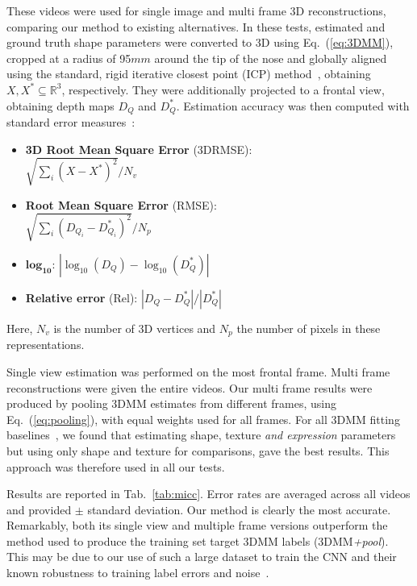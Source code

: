 \documentclass[10pt,twocolumn,letterpaper]{article}
\begin{document}
These videos were used for single image and multi frame 3D reconstructions, comparing our method to existing alternatives. In these tests, estimated and ground truth shape parameters were converted to 3D using Eq.~(\ref{eq:3DMM}), cropped at a radius of 95$mm$ around the tip of the nose and globally aligned using the standard, rigid iterative closest point (ICP) method~\cite{besl1992method}, obtaining $X, X^*\subseteq \mathbb{R}^3$, respectively. They were additionally projected to a frontal view, obtaining depth maps $D_Q$ and $D_Q^*$. Estimation accuracy was then computed with standard error measures~\cite{hassner2013viewing,saxena08dist}:
\begin{itemize}
\item {\bf 3D Root Mean Square Error} (3DRMSE):\\$\sqrt{ \sum_i (X - X^*)^2} /N_v$
\item {\bf Root Mean Square Error} (RMSE):\\$\sqrt{ \sum_i (D_{Q_i} - D_{Q_i}^*)^2} /N_p$
\item $\mathbf{log_{10}}$: $|\log_{10}(D_Q)-\log_{10}(D_Q^*)|$
\item {\bf Relative error} (Rel): $|D_Q-D_Q^*|/|D_Q^*|$
\end{itemize}
Here, $N_v$ is the number of 3D vertices and $N_p$ the number of pixels in these representations.

Single view estimation was performed on the most frontal frame. Multi frame reconstructions were given the entire videos. Our multi frame results were produced by pooling 3DMM estimates from different frames, using Eq.~(\ref{eq:pooling}), with equal weights used for all frames. For all 3DMM fitting baselines~\cite{Bas:accvw16,huber:3dmm,romdhani2005estimating,Zhu2016Face}, we found that estimating shape, texture {\em and expression} parameters but using only shape and texture for comparisons, gave the best results. This approach was therefore used in all our tests.






Results are reported in Tab.~\ref{tab:micc}. Error rates are averaged across all videos and provided $\pm$ standard deviation. Our method is clearly the most accurate. Remarkably, both its single view and multiple frame versions outperform the method used to produce the training set target 3DMM labels (3DMM\emph{+pool}). This may be due to our use of such a large dataset to train the CNN and their known robustness to training label errors and noise~\cite{xie2016disturblabel}. 
\end{document}

